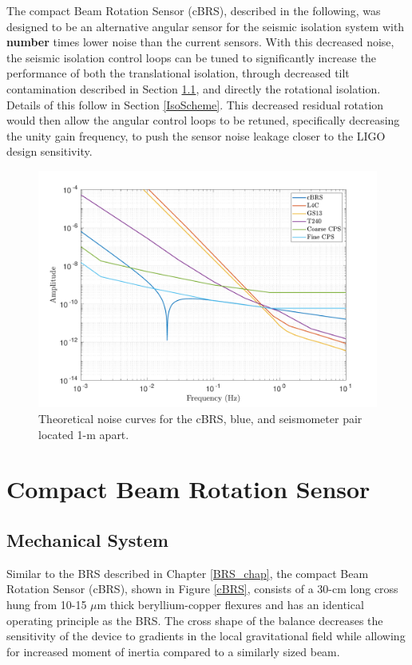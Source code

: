\documentclass [12pt, proquest]{uwthesis}[2019]
\begin{document}
The compact Beam Rotation Sensor (cBRS), described in the following, was designed to be an alternative angular sensor for the seismic isolation system with \textbf{number} times lower noise than the current sensors. With this decreased noise, the seismic isolation control loops can be tuned to significantly increase the performance of both the translational isolation, through decreased tilt contamination described in Section \ref{}, and directly the rotational isolation. Details of this follow in Section \ref{IsoScheme}. This decreased residual rotation would then allow the angular control loops to be retuned, specifically decreasing the unity gain frequency, to push the sensor noise leakage closer to the LIGO design sensitivity.

\begin{figure}%
\begin{center}
\includegraphics[width=\textwidth]{cBRS_Model_Noise.pdf}
\caption{Theoretical noise curves for the cBRS, blue, and seismometer pair located 1-m apart.}
\label{sensNoise}
\end{center}
\end{figure}


\section{Compact Beam Rotation Sensor} \label{cBRSSec}
\subsection{Mechanical System}

Similar to the BRS described in Chapter \ref{BRS_chap}, the compact Beam Rotation Sensor (cBRS), shown in Figure \ref{cBRS}, consists of a 30-cm long cross hung from 10-15 $\mu$m thick beryllium-copper flexures and has an identical operating principle as the BRS. The cross shape of the balance decreases the sensitivity of the device to gradients in the local gravitational field while allowing for increased moment of inertia compared to a similarly sized beam. 
\end{document}
